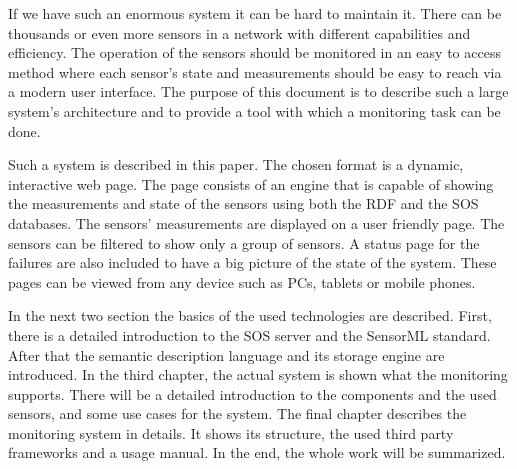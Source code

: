 If we have such an enormous system it can be hard to maintain it. There can be thousands or even more sensors in a network with different capabilities and efficiency. The operation of the sensors should be monitored in an easy to access method where each sensor's state and measurements should be easy to reach via a modern user interface. The purpose of this document is to describe such a large system's architecture and to provide a tool with which a monitoring task can be done.

Such a system is described in this paper. The chosen format is a dynamic, interactive web page. The page consists of an engine that is capable of showing the measurements and state of the sensors using both the RDF and the SOS databases. The sensors' measurements are displayed on a user friendly page. The sensors can be filtered to show only a group of sensors. A status page for the failures are also included to have a big picture of the state of the system. These pages can be viewed from any device such as PCs, tablets or mobile phones.

In the next two section the basics of the used technologies are described. First, there is a detailed introduction to the SOS server and the SensorML standard. After that the semantic description language and its storage engine are introduced. 
In the third chapter, the actual system is shown what the monitoring supports. 
There will be a detailed introduction to the components and the used sensors, and some use cases for the system. The final chapter describes the monitoring system in details. It shows its structure, the used third party frameworks and a usage manual. In the end, the whole work will be summarized. 

